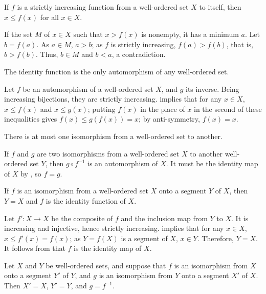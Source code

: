 \documentclass{article}
\begin{document}
\begin{theorem}
  \label{thm:hw1jxum0}
  If \(f\) is a strictly increasing function from a well-ordered set
  \(X\) to itself, then \(x \leq f(x)\) for all \(x \in X\).
\end{theorem}

If the set \(M\) of \(x \in X\) such that \(x > f(x)\) is nonempty,
it has a minimum \(a\).  Let \(b = f(a)\).  As \(a \in M\), \(a > b\);
as \(f\) is strictly increasing, \(f(a) > f(b)\), that is,
\(b > f(b)\).  Thus, \(b \in M\) and \(b < a\), a contradiction.

\begin{theorem}
  \label{thm:yvftewxp}
  The identity function is the only automorphism of any well-ordered
  set.
\end{theorem}

Let \(f\) be an automorphism of a well-ordered set \(X\), and \(g\)
its inverse.  Being increasing bijections, they are strictly
increasing.   implies that for any \(x \in X\),
\(x \leq f(x)\) and \(x \leq g(x)\); putting \(f(x)\) in the place of
\(x\) in the second of these inequalities gives
\(f(x) \leq g(f(x)) = x\); by anti-symmetry, \(f(x) = x\).

\begin{theorem}
  \label{thm:uvocd4lt}
  There is at most one isomorphism from a well-ordered set to another.
\end{theorem}

If \(f\) and \(g\) are two isomorphisms from a well-ordered set \(X\)
to another well-ordered set \(Y\), then \(g \circ f^{-1}\) is an
automorphism of \(X\).  It must be the identity map of \(X\) by
, so \(f = g\).

\begin{theorem}
  \label{thm:q14zcdkw}
  If \(f\) is an isomorphism from a well-ordered set \(X\) onto a
  segment \(Y\) of \(X\), then \(Y = X\) and \(f\) is the identity
  function of \(X\).
\end{theorem}

Let \(f' : X \to X\) be the composite of \(f\) and the inclusion map
from \(Y\) to \(X\).  It is increasing and injective, hence strictly
increasing.   implies that for any \(x \in X\),
\(x \leq f'(x) = f(x)\); as \(Y = f(X)\) is a segment of \(X\),
\(x \in Y\).  Therefore, \(Y = X\).  It follows from
 that \(f\) is the identity map of \(X\).

\begin{theorem}
  \label{thm:7z7bwher}
  Let \(X\) and \(Y\) be well-ordered sets, and suppose that \(f\) is
  an isomorphism from \(X\) onto a segment \(Y'\) of \(Y\), and \(g\)
  is an isomorphism from \(Y\) onto a segment \(X'\) of \(X\).  Then
  \(X' = X\), \(Y' = Y\), and \(g = f^{-1}\).
\end{theorem}
\end{document}
